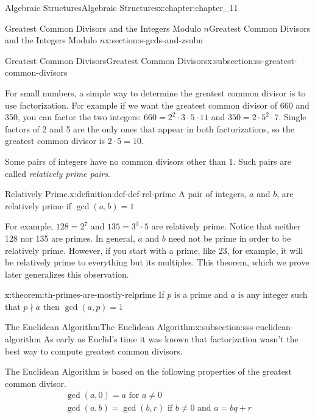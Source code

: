 \documentclass[twoside,10pt,]{book}
\numberwithin{equation}{section}
\begin{document}
\begin{chapterptx}{Algebraic Structures}{}{Algebraic Structures}{}{}{x:chapter:chapter_11}
\begin{sectionptx}{Greatest Common Divisors  and the Integers Modulo \(n\)}{}{Greatest Common Divisors  and the Integers Modulo \(n\)}{}{}{x:section:s-gcds-and-zsubn}
\begin{subsectionptx}{Greatest Common Divisors}{}{Greatest Common Divisors}{}{}{x:subsection:ss-greatest-common-divisors}
\par
For small numbers, a simple way to determine the greatest common divisor is to use factorization.  For example if we want the greatest common divisor of 660 and 350, you can factor the two integers:  \(660=2^2\cdot 3\cdot 5\cdot 11\) and \(350 = 2 \cdot 5^2\cdot 7\).     Single factors of 2 and 5 are the only ones that appear in both factorizations, so the greatest common divisor is \(2\cdot 5 =10\).%
\par
Some pairs of integers have no common divisors other than 1.  Such pairs are called \emph{relatively prime pairs}.%
\begin{definition}{Relatively Prime.}{x:definition:def-def-rel-prime}%
%
A pair of integers, \(a\) and \(b\), are relatively prime if \(\gcd(a, b)=1\)%
\end{definition}
For example, \(128=2^7\) and \(135=3^3\cdot 5\) are relatively prime.    Notice that neither 128 nor 135 are primes.   In general, \(a\) and \(b\) need not be prime in order to be relatively prime.  However, if you start with a prime, like 23, for example, it will be relatively prime to everything but its multiples.  This theorem, which we prove later generalizes this observation.%
\begin{theorem}{}{}{x:theorem:th-primes-are-mostly-relprime}%
If \(p\) is a prime and \(a\) is any integer such that \(p\nmid a\)  then \(\gcd(a, p) = 1\)%
\end{theorem}
\end{subsectionptx}
%
%
\typeout{************************************************}
\typeout{************************************************}
%
\begin{subsectionptx}{The Euclidean Algorithm}{}{The Euclidean Algorithm}{}{}{x:subsection:sss-euclidean-algorithm}
%
As early as Euclid's time it was known that factorization wasn't the best way to compute greatest common divisors.%
\par
The Euclidean Algorithm is based on the following properties of the greatest common divisor.%
\begin{gather}
\gcd(a,0)= a \textrm{  for  } a\neq 0\label{x:mrow:eq-euclid-basis}\\
\gcd(a, b)= \gcd(b, r)\textrm{   if } b\neq 0\textrm{   and }a = b q + r\label{x:mrow:eq-euclid-recursion}
\end{gather}
%
\par

\end{subsectionptx}
\end{sectionptx}
\end{chapterptx}
\end{document}
